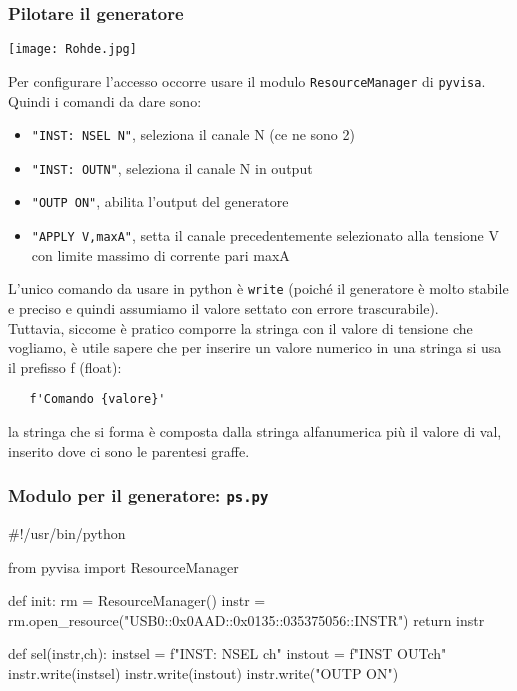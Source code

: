 \begin{frame}[fragile]
  \frametitle{Pilotare il generatore}
  \footnotesize
  \begin{center}
     \texttt{[image: Rohde.jpg]}
  \end{center}
  \vskip -0.2cm
  Per configurare l'accesso occorre usare il modulo {\tt ResourceManager} di {\tt pyvisa}.
  Quindi i comandi da dare sono:
  \begin{itemize}
    \item  {\tt "INST: NSEL N"}, seleziona il canale N (ce ne sono 2)
    \item  {\tt "INST: OUTN"},   seleziona il canale N in output
    \item  {\tt "OUTP ON"},      abilita l'output del generatore
    \item  {\tt "APPLY V,maxA"}, setta il canale precedentemente selezionato alla tensione V con limite massimo di corrente pari maxA
  \end{itemize}
  L'unico comando da usare in python \`e {\tt write} (poich\'e il generatore \`e molto stabile e preciso e quindi assumiamo il valore settato con errore trascurabile).\\
  Tuttavia, siccome \`e pratico comporre la stringa con il valore di tensione che vogliamo, \`e utile sapere che per inserire un valore numerico in una stringa si usa il prefisso f (float):
\begin{verbatim}
   f'Comando {valore}'
\end{verbatim}
  la stringa che si forma \`e composta dalla stringa alfanumerica pi\`u il valore di val, inserito dove ci sono le parentesi graffe.
\end{frame}
  

\begin{frame}[fragile]
  \frametitle{Modulo per il generatore: {\tt ps.py}}
\begin{python}
#!/usr/bin/python

from   pyvisa import ResourceManager

def init:
    rm = ResourceManager()
    instr = rm.open_resource("USB0::0x0AAD::0x0135::035375056::INSTR")
    return instr

def sel(instr,ch):
    instsel = f"INST: NSEL {ch}"
    instout = f"INST OUT{ch}"
    instr.write(instsel)
    instr.write(instout)
    instr.write("OUTP ON")

\end{python}
\end{frame}

